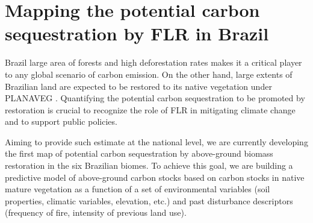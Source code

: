 



\section{\Large Mapping the potential carbon sequestration by FLR in Brazil}  \label{sec:car-soil}

Brazil large area of forests and high deforestation rates makes it a critical player to any global scenario of carbon emission. On the other hand, large extents of Brazilian land are expected to be restored to its native vegetation under PLANAVEG \citep{BrazilianMinistryofEnvironment2017}. Quantifying the potential carbon sequestration to be promoted by restoration is crucial to recognize the role of FLR in mitigating climate change and to support public policies. 

Aiming to provide such estimate at the national level, we are currently developing the first map of potential carbon sequestration by above-ground biomass restoration in the six Brazilian biomes. To achieve this goal, we are building a predictive model of above-ground carbon stocks based on carbon stocks in native mature vegetation as a function of a set of environmental variables (soil properties, climatic variables, elevation, etc.) and past disturbance descriptors (frequency of fire, intensity of previous land use). 

